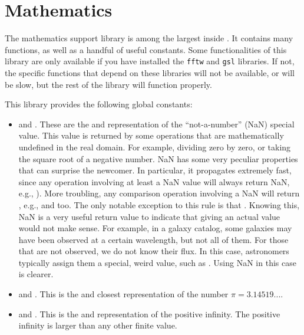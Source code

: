 \section{Mathematics \label{SEC:support:math}}

The mathematics support library is among the largest inside \phypp. It contains many functions, as well as a handful of useful constants. Some functionalities of this library are only available if you have installed the \texttt{fftw} and \texttt{gsl} libraries. If not, the specific functions that depend on these libraries will not be available, or will be slow, but the rest of the library will function properly.

This library provides the following global constants:
\begin{itemize}
\item {} and . These are the  and  representation of the ``not-a-number'' (NaN) special value. This value is returned by some operations that are mathematically undefined in the real domain. For example, dividing zero by zero, or taking the square root of a negative number. NaN has some very peculiar properties that can surprise the newcomer. In particular, it propagates extremely fast, since any operation involving at least a NaN value will always return NaN, e.g., ). More troubling, any comparison operation involving a NaN will return \cppfalse, e.g.,  and  too. The only notable exception to this rule is that . Knowing this, NaN is a very useful return value to indicate that giving an actual value would not make sense. For example, in a galaxy catalog, some galaxies may have been observed at a certain wavelength, but not all of them. For those that are not observed, we do not know their flux. In this case, astronomers typically assign them a special, weird value, such as . Using NaN in this case is clearer.

\item {} and . This is the  and  closest representation of the number $\pi = 3.14519...$.

\item {} and . This is the  and  representation of the positive infinity. The positive infinity is larger than any other finite value.
\end{itemize}

